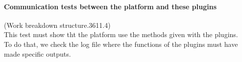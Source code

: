 \paragraph{Communication tests between the platform and these plugins}
(Work breakdown structure.3611.4)\\
This test must show tht the platform use the methods given with the plugins.\\
To do that, we check the log file where the functions of the plugins must have made specific outputs.








